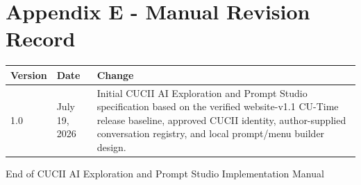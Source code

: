 \documentclass[11pt,letterpaper]{article}
\begin{document}
\section{Appendix E - Manual Revision Record}

\begin{tabularx}{\textwidth}{L{0.75in}L{1.1in}Y}
\toprule
\textbf{Version} & \textbf{Date} & \textbf{Change} \\
 & July 19, 2026 & Initial CUCII AI Exploration and Prompt Studio specification based on the verified website-v1.1 CU-Time release baseline, approved CUCII identity, author-supplied conversation registry, and local prompt/menu builder design. \\
\bottomrule
\end{tabularx}

\vfill
\begin{center}
\textcolor{CUMuted}{End of CUCII AI Exploration and Prompt Studio Implementation Manual}
\end{center}
\end{document}
